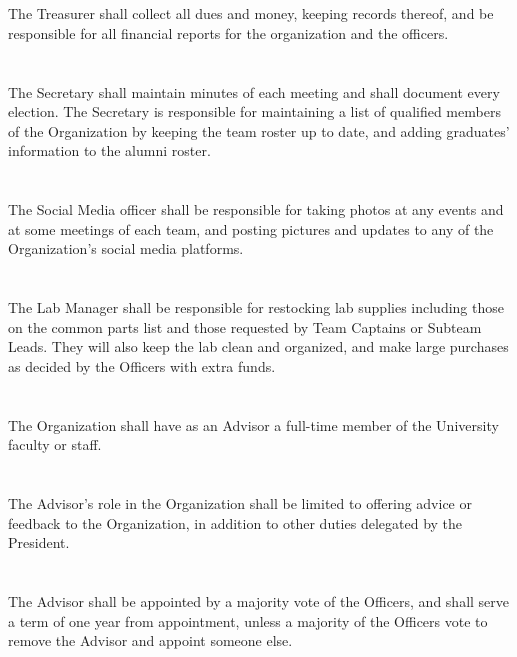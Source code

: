 \documentclass[12pt]{cls/constitution}
\begin{document}
\section{}
The Treasurer shall collect all dues and money, keeping records thereof, and be responsible for all financial reports for the organization and the officers.

\section{}
The Secretary shall maintain minutes of each meeting and shall document every election. The Secretary is responsible for maintaining a list of qualified members of the Organization by keeping the team roster up to date, and adding graduates' information to the alumni roster.

\section{}
The Social Media officer shall be responsible for taking photos at any events and at some meetings of each team, and posting pictures and updates to any of the Organization's social media platforms.

\section{}
The Lab Manager shall be responsible for restocking lab supplies including those on the common parts list and those requested by Team Captains or Subteam Leads. They will also keep the lab clean and organized, and make large purchases as decided by the Officers with extra funds. 

\section{}
The Organization shall have as an Advisor a full-time member of the University faculty or staff.

\section{}
The Advisor’s role in the Organization shall be limited to offering advice or feedback to the Organization, in addition to other duties delegated by the President.

\section{}
The Advisor shall be appointed by a majority vote of the Officers, and shall serve a term of one year from appointment, unless a majority of the Officers vote to remove the Advisor and appoint someone else. 
\end{document}
